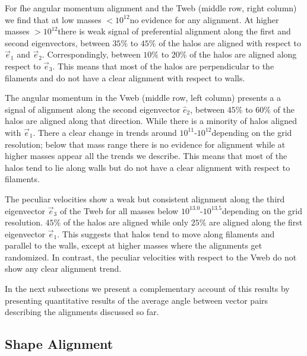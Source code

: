 \documentclass[useAMS,usenatbib]{mn2e}
\newcommand{\hMsun}{{\ifmmode{h^{-1}{\rm
        {M_{\odot}}}}\else{$h^{-1}{\rm{M_{\odot}}}$}\fi}}
\begin{document}
For fhe angular momentum alignment and the Tweb (middle row, right
column) we find that at low masses $<10^{12}$\hMsun no evidence for
any alignment. At higher masses $>10^{12}$\hMsun there is weak signal
of preferential alignment along the first and second eigenvectors,
between $35\%$ to $45\%$ of the halos are aligned with respect to
$\vec{e}_1$ and $\vec{e}_2$. Correspondingly, between $10\%$ to $20\%$
of the halos are aligned along respect to $\vec{e}_{3}$. This means
that most of the halos are perpendicular to the filaments and do not
have a clear alignment with respect to walls.

The angular momentum in the Vweb (middle row, left column) presents a
a signal of alignment along the second eigenvector $\hat{e}_{2}$,
between $45\%$ to $60\%$ of the halos are aligned along that
direction. While there is a minority of halos aligned with
$\vec{e}_{1}$.  There a clear change in trends around
$10^{11}$\hMsun-$10^{12}$\hMsun depending on the grid resolution;
below that mass range there is no evidence for alignment while at
higher masses appear all the trends we describe. This means that most
of the halos tend to lie along walls but do not have a clear alignment
with respect to filaments.

The peculiar velocities show a weak but consistent alignment along the
third eigenvector $\vec{e}_{3}$ of the Tweb for all masses below
$10^{13.0}$\hMsun-$10^{13.5}$\hMsun depending on the grid
resolution. $45\%$ of the halos are aligned while only $25\%$ are
aligned along the first eigenvector $\vec{e}_1$. This suggests that
halos tend to move along filaments and parallel to the walls, except
at higher masses where the alignments get randomized.  In contrast,
the peculiar velocities with respect to the Vweb do not show any clear
alignment trend. 


In the next subsections we present a complementary account of this
results by presenting quantitative results of the average angle
between vector pairs describing the alignments discussed so far.


\subsection{Shape Alignment}
\end{document}
